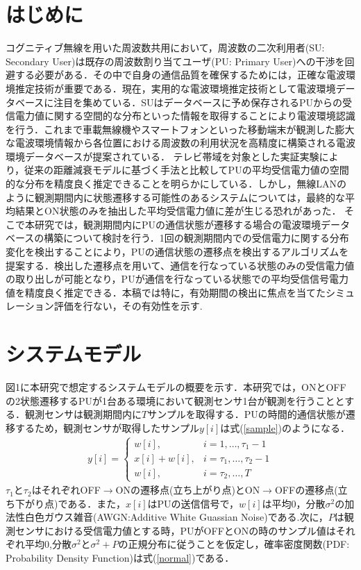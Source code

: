 \documentclass[10pt, twocolumn, a4j]{jsarticle}
\begin{document}
\section{はじめに}
コグニティブ無線\cite{Haykin}を用いた周波数共用において，周波数の二次利用者(SU: Secondary User)は既存の周波数割り当てユーザ(PU: Primary User)への干渉を回避する必要がある．その中で自身の通信品質を確保するためには，正確な電波環境推定技術が重要である．現在，実用的な電波環境推定技術として電波環境データベースに注目を集めている．SUはデータベースに予め保存されるPUからの受信電力値に関する空間的な分布といった情報を取得することにより電波環境認識を行う．これまで車載無線機やスマートフォンといった移動端末が観測した膨大な電波環境情報から各位置における周波数の利用状況を高精度に構築される電波環境データベースが提案されている\cite{DB}．
テレビ帯域を対象とした実証実験により，従来の距離減衰モデルに基づく手法と比較してPUの平均受信電力値の空間的な分布を精度良く推定できることを明らかにしている．しかし，無線LANのように観測期間内に状態遷移する可能性のあるシステムについては，最終的な平均結果とON状態のみを抽出した平均受信電力値に差が生じる恐れがあった．
そこで本研究では，観測期間内にPUの通信状態が遷移する場合の電波環境データベースの構築について検討を行う．1回の観測期間内での受信電力に関する分布変化を検出することにより，PUの通信状態の遷移点を検出するアルゴリズムを提案する．検出した遷移点を用いて、通信を行なっている状態のみの受信電力値の取り出しが可能となり，PUが通信を行なっている状態での平均受信信号電力値を精度良く推定できる．本稿では特に，有効期間の検出に焦点を当てたシミュレーション評価を行ない，その有効性を示す.
\section{システムモデル}
図1に本研究で想定するシステムモデルの概要を示す．本研究では，ONとOFFの2状態遷移するPUが1台ある環境において観測センサ1台が観測を行うこととする．観測センサは観測期間内に$T$サンプルを取得する．PUの時間的通信状態が遷移するため，観測センサが取得したサンプル$y[i]$は式(\ref{sample})のようになる．
\begin{align}
y[i]=
\left\{
\begin{array}{ll}
w[i], & i=1,\dots,\tau_1-1 \\
x[i]+w[i],& i=\tau_1,\dots,\tau_2-1 \\
w[i],& i=\tau_2,\dots,T 
\end{array}
\right.
\label{sample}
\end{align}
$\tau_1$と$\tau_2$はそれぞれOFF$\rightarrow$ONの遷移点(立ち上がり点)とON$\rightarrow$OFFの遷移点(立ち下がり点)である．また，$x[i]$はPUの送信信号で，$w[i]$は平均0，分散$\sigma^{2}$の加法性白色ガウス雑音(AWGN:Additive White Guassian Noise)である.次に，$P$は観測センサにおける受信電力値とする時，PUがOFFとONの時のサンプル値はそれぞれ平均0,分散$\sigma^2$と$\sigma^2+P$の正規分布に従うことを仮定し，確率密度関数(PDF: Probability Density Function)は式(\ref{normal})である．
\end{document}
